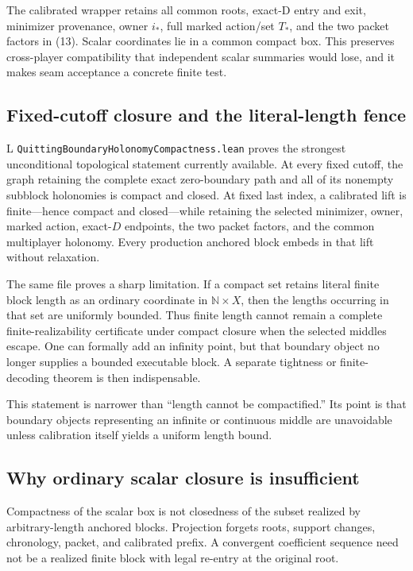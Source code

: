\documentclass[11pt]{article}
\newcommand{\LTag}{\textsf{L}}
\newcommand{\Prod}{\LTag}
\newcommand{\Status}[1]{#1}
\begin{document}
The calibrated wrapper retains all common roots, exact-D entry and exit,
minimizer provenance, owner \(i_*\), full marked action/set \(T_*\), and the
two packet factors in (13).  Scalar coordinates lie in a common compact box.
This preserves cross-player compatibility that independent scalar summaries
would lose, and it makes seam acceptance a concrete finite test.

\subsection{Fixed-cutoff closure and the literal-length fence}

\Status{\Prod} \texttt{QuittingBoundaryHolonomyCompactness.lean} proves the
strongest unconditional topological statement currently available.  At every
fixed cutoff, the graph retaining the complete exact zero-boundary path and
all of its nonempty subblock holonomies is compact and closed.  At fixed last
index, a calibrated lift is finite---hence compact and closed---while retaining
the selected minimizer, owner, marked action, exact-$D$ endpoints, the two
packet factors, and the common multiplayer holonomy.  Every production
anchored block embeds in that lift without relaxation.

The same file proves a sharp limitation.  If a compact set retains literal
finite block length as an ordinary coordinate in $\mathbb N\times X$, then
the lengths occurring in that set are uniformly bounded.  Thus finite length
cannot remain a complete finite-realizability certificate under compact
closure when the selected middles escape.  One can formally add an infinity
point, but that boundary object no longer supplies a bounded executable block.
A separate tightness or finite-decoding theorem is then indispensable.

This statement is narrower than ``length cannot be compactified.''  Its point
is that boundary objects representing an infinite or continuous middle are
unavoidable unless calibration itself yields a uniform length bound.

\subsection{Why ordinary scalar closure is insufficient}

Compactness of the scalar box is not closedness of the subset realized by
arbitrary-length anchored blocks.  Projection forgets roots, support changes,
chronology, packet, and calibrated prefix.  A convergent coefficient sequence
need not be a realized finite block with legal re-entry at the original root.
\end{document}

